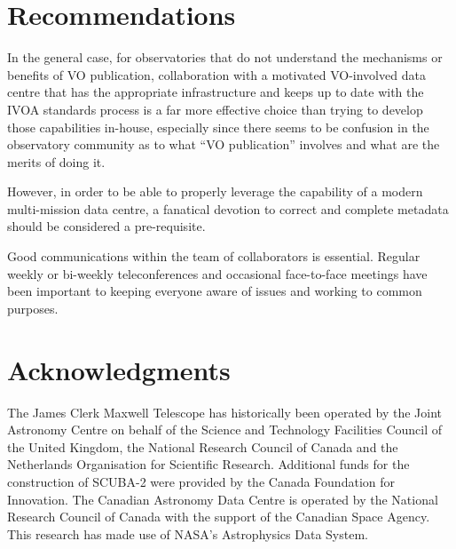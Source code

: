 \documentclass[final,authoryear,5p,times,twocolumn]{elsarticle}
\begin{document}
\section{Recommendations}

In the general case, for observatories that do not understand the
mechanisms or benefits of VO publication, collaboration with a
motivated VO-involved data centre that has the appropriate
infrastructure and keeps up to date with the IVOA standards process is
a far more effective choice than trying to develop those capabilities
in-house, especially since there seems to be confusion in the
observatory community as to what ``VO publication'' involves and what
are the merits of doing it.

However, in order to be able to properly leverage the capability of a
modern multi-mission data centre, a fanatical devotion to correct and
complete metadata should be considered a pre-requisite.

Good communications within the team of collaborators is essential.  Regular
weekly or bi-weekly teleconferences and occasional face-to-face meetings
have been important to keeping everyone aware of issues and working to
common purposes.

\section*{Acknowledgments}

The James Clerk Maxwell Telescope has historically been operated by
the Joint Astronomy Centre on behalf of the Science and Technology
Facilities Council of the United Kingdom, the National Research
Council of Canada and the Netherlands Organisation for Scientific
Research.  Additional funds for the construction of SCUBA-2 were
provided by the Canada Foundation for Innovation.
The Canadian Astronomy Data Centre is operated by the
National Research Council of Canada with the support of the Canadian
Space Agency. This research has made use of NASA's Astrophysics
Data System.
\end{document}
